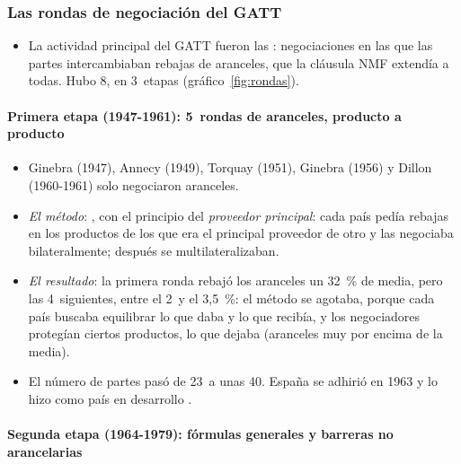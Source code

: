 \documentclass[11pt]{article}
\begin{document}
\subsubsection{Las rondas de negociación del GATT}\label{sec:rondas}

\begin{itemize}
\item La actividad principal del GATT fueron las : negociaciones en las que las partes intercambiaban rebajas de aranceles, que la cláusula NMF extendía a todas. Hubo 8, en 3~etapas (gráfico~\ref{fig:rondas}).
\end{itemize}

\paragraph{Primera etapa (1947-1961): 5~rondas de aranceles, producto a producto}

\begin{itemize}
\item Ginebra (1947), Annecy (1949), Torquay (1951), Ginebra (1956) y Dillon (1960-1961) solo negociaron aranceles.
\item \emph{El método}: , con el principio del \emph{proveedor principal}: cada país pedía rebajas en los productos de los que era el principal proveedor de otro y las negociaba bilateralmente; después se multilateralizaban.
\item \emph{El resultado}: la primera ronda rebajó los aranceles un 32~\% de media, pero las 4~siguientes, entre el 2~y el 3,5~\%: el método se agotaba, porque cada país buscaba equilibrar lo que daba y lo que recibía, y los negociadores protegían ciertos productos, lo que dejaba  (aranceles muy por encima de la media)\nocite{Baldwin2012Case}.
\item El número de partes pasó de 23~a unas 40. España se adhirió en 1963 y lo hizo como país en desarrollo .
\end{itemize}

\paragraph{Segunda etapa (1964-1979): fórmulas generales y barreras no arancelarias}
\end{document}
